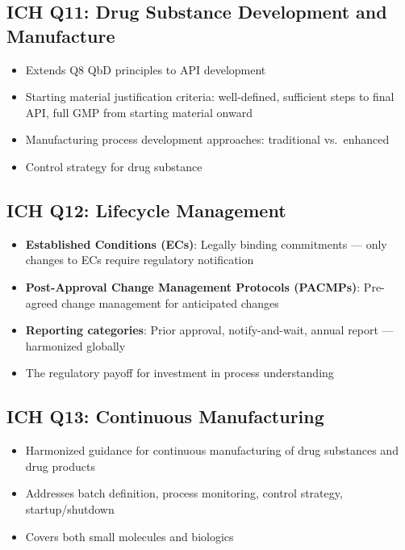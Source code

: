 \documentclass[
  11pt,
  a4paper,
]{report}
\providecommand{\tightlist}{%
  \setlength{\itemsep}{0pt}\setlength{\parskip}{0pt}}
\begin{document}
\hypertarget{ich-q11-drug-substance-development-and-manufacture}{%
\subsection{ICH Q11: Drug Substance Development and
Manufacture}\label{ich-q11-drug-substance-development-and-manufacture}}

\begin{itemize}
\tightlist
\item
  Extends Q8 QbD principles to API development
\item
  Starting material justification criteria: well-defined, sufficient
  steps to final API, full GMP from starting material onward
\item
  Manufacturing process development approaches: traditional vs.~enhanced
\item
  Control strategy for drug substance
\end{itemize}

\hypertarget{ich-q12-lifecycle-management}{%
\subsection{ICH Q12: Lifecycle
Management}\label{ich-q12-lifecycle-management}}

\begin{itemize}
\tightlist
\item
  \textbf{Established Conditions (ECs)}: Legally binding commitments ---
  only changes to ECs require regulatory notification
\item
  \textbf{Post-Approval Change Management Protocols (PACMPs)}:
  Pre-agreed change management for anticipated changes
\item
  \textbf{Reporting categories}: Prior approval, notify-and-wait, annual
  report --- harmonized globally
\item
  The regulatory payoff for investment in process understanding
\end{itemize}

\hypertarget{ich-q13-continuous-manufacturing}{%
\subsection{ICH Q13: Continuous
Manufacturing}\label{ich-q13-continuous-manufacturing}}

\begin{itemize}
\tightlist
\item
  Harmonized guidance for continuous manufacturing of drug substances
  and drug products
\item
  Addresses batch definition, process monitoring, control strategy,
  startup/shutdown
\item
  Covers both small molecules and biologics
\end{itemize}
\end{document}
